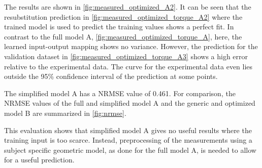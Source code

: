The results are shown in \cref{fig:measured_optimized_A2}. It can be seen that the resubstitution prediction in \cref{fig:measured_optimized_torque_A2} where the trained model is used to predict the training values shows a perfect fit. In contrast to the full model A, \cref{fig:measured_optimized_torque_A}, here, the learned input-output mapping shows no variance. However, the prediction for the validation dataset in \cref{fig:measured_optimized_torque_A3} shows a high error relative to the experimental data. The curve for the experimental data even lies outside the 95\% confidence interval of the prediction at some points. 

The simplified model A has a NRMSE value of 0.461. For comparison, the NRMSE values of the full and simplified model A and the generic and optimized model B are summarized in \cref{fig:nrmse}. 

This evaluation shows that simplified model A gives no useful results where the training input is too scarce. Instead, preprocessing of the measurements using a subject specific geometric model, as done for the full model A, is needed to allow for a useful prediction.

